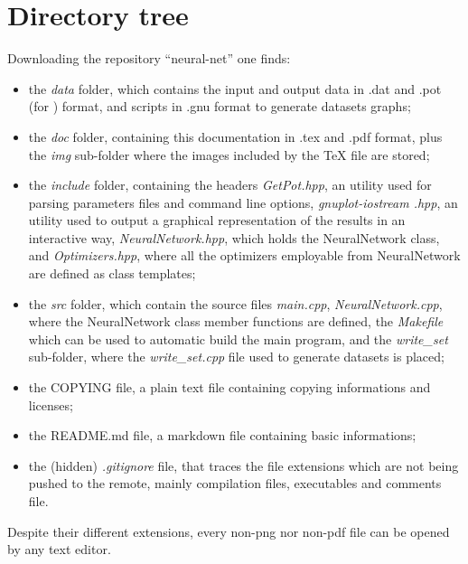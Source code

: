 \documentclass[12pt, a4paper]{report}
\theoremstyle{definition}
\begin{document}
\section{Directory tree}
Downloading the repository ``neural-net'' one finds:
\begin{itemize}
	\item the \textit{data} folder, which contains the input and output data in .dat and .pot (for \cite{getpot}) format, and \cite{gnuplot} scripts in .gnu format to generate datasets graphs;
	\item the \textit{doc} folder, containing this documentation in .tex and .pdf format, plus the \textit{img} sub-folder where the images included by the TeX file are stored;
	\item the \textit{include} folder, containing the headers \textit{GetPot.hpp}, an utility used for parsing parameters files and command line options, \textit{gnuplot-iostream .hpp}, an utility used to output a graphical representation of the results in an interactive way, \textit{NeuralNetwork.hpp}, which holds the NeuralNetwork class, and \textit{Optimizers.hpp}, where all the optimizers employable from NeuralNetwork are defined as class templates;
	\item the \textit{src} folder, which contain the source files \textit{main.cpp}, \textit{NeuralNetwork.cpp}, where the NeuralNetwork class member functions are defined, the \textit{Makefile} which can be used to automatic build the main program, and the \textit{write\_set} sub-folder, where the \textit{write\_set.cpp} file used to generate datasets is placed;
	\item the COPYING file, a plain text file containing copying informations and licenses;
	\item the README.md file, a markdown file containing basic informations;
	\item the (hidden) \textit{.gitignore} file, that traces the file extensions which are not being pushed to the remote, mainly compilation files, executables and comments file.
\end{itemize}
\noindent Despite their different extensions, every non-png nor non-pdf file can be opened by any text editor.
\end{document}
